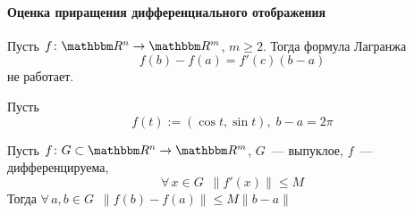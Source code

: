 \documentclass[12pt,timbord]{../../../notes}
\begin{document}
\paragraph{Оценка приращения дифференциального отображения}
\label{par:diffspace::diffestim}

\begin{prop}\label{prop:diffspace::diffestim::lagrfail}
  Пусть $f\colon \R^n \to \R^m$, $m \geqslant 2$. Тогда формула Лагранжа
  \[
    f(b) - f(a) = f'(c)(b - a)
  \]
  не работает.
\end{prop}
\begin{exmp*}\label{exmp:diffspace::diffestim::lagrfail}
  Пусть 
  \[
    f(t) := (\cos t, \sin t),\; b - a = 2\pi
  \]
\end{exmp*}

\begin{thrm}\label{thrm:diffspace::diffestim::diffestim}
  Пусть $f\colon G \subset \R^n \to \R^m$, $G$~--- выпуклое, $f$~--- дифференцируема, 
  \[ 
    \forall\, x \in G \;\: \| f'(x) \| \leqslant M 
  \]
  Тогда $\forall\, a,b \in G \;\: \|f(b) - f(a)\| \leqslant M \| b-a \|$
\end{thrm}
\end{document}
